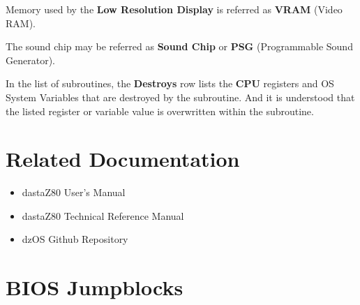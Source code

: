 \documentclass[a4paper,11pt]{article}
\begin{document}
    Memory used by the \textbf{Low Resolution Display} is referred as
    \textbf{VRAM} (Video RAM).

    The sound chip may be referred as \textbf{Sound Chip} or \textbf{PSG}
    (Programmable Sound Generator).

    In the list of subroutines, the \textbf{Destroys} row lists the \textbf{CPU}
    registers and OS System Variables that are destroyed by the subroutine. And 
    it is understood that the listed register or variable value is overwritten
    within the subroutine.

    \pagebreak
    \section*{Related Documentation}
    \begin{itemize}
        \item dastaZ80 User's Manual\cite{dastaz80userman}
        \item dastaZ80 Technical Reference Manual\cite{dastaz80techman}
        \item dzOS Github Repository\cite{dastaZ80github}
    \end{itemize}

    \pagebreak
    \tableofcontents

    \pagebreak
    \pagestyle{fancy}
    \fancyhf{}
    \fancyfoot[R]{\thepage}
    \setcounter{page}{1}
    
    
    \pagebreak
    
    \pagebreak
    \begingroup
        \let\clearpage\relax
        \section{BIOS Jumpblocks}
        
        
        
        
        
        
        
        
        
    \endgroup
    \pagebreak
    \begingroup
        \let\clearpage\relax
\end{document}
